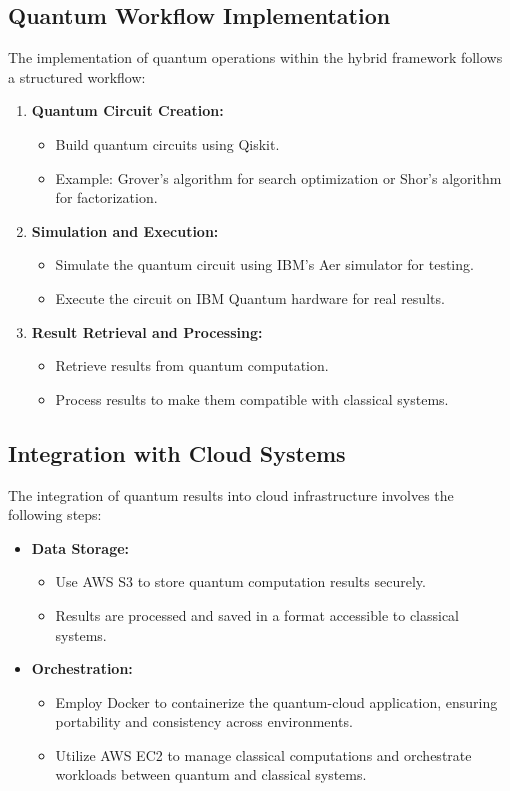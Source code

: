 \documentclass[12pt,a4paper]{article}
\begin{document}
\subsection{Quantum Workflow Implementation}
The implementation of quantum operations within the hybrid framework follows a structured workflow:
\begin{enumerate}
    \item \textbf{Quantum Circuit Creation:}
    \begin{itemize}
        \item Build quantum circuits using Qiskit.
        \item Example: Grover's algorithm for search optimization or Shor's algorithm for factorization.
    \end{itemize}
    \item \textbf{Simulation and Execution:}
    \begin{itemize}
        \item Simulate the quantum circuit using IBM's Aer simulator for testing.
        \item Execute the circuit on IBM Quantum hardware for real results.
    \end{itemize}
    \item \textbf{Result Retrieval and Processing:}
    \begin{itemize}
        \item Retrieve results from quantum computation.
        \item Process results to make them compatible with classical systems.
    \end{itemize}
\end{enumerate}

\subsection{Integration with Cloud Systems}
The integration of quantum results into cloud infrastructure involves the following steps:
\begin{itemize}
    \item \textbf{Data Storage:}
    \begin{itemize}
        \item Use AWS S3 to store quantum computation results securely.
        \item Results are processed and saved in a format accessible to classical systems.
    \end{itemize}
    \item \textbf{Orchestration:}
    \begin{itemize}
        \item Employ Docker to containerize the quantum-cloud application, ensuring portability and consistency across environments.
        \item Utilize AWS EC2 to manage classical computations and orchestrate workloads between quantum and classical systems.
    \end{itemize}
\end{itemize}
\end{document}
